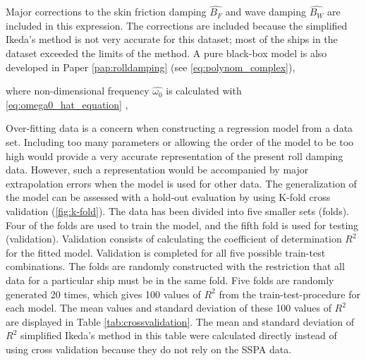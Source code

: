 \noindent Major corrections to the skin friction damping $\hat{B_F}$ and wave damping $\hat{B_W}$ are included in this expression. The corrections are included because the simplified Ikeda's method is not very accurate for this dataset; most of the ships in the dataset exceeded the limits of the method. A pure black-box model is also developed in Paper \ref{pap:rolldamping} (see \autoref{eq:polynom_complex}),

\noindent where non-dimensional frequency $\hat{\omega_0}$ is calculated with \autoref{eq:omega0_hat_equation} \cite{himenoPredictionShipRoll1981},

Over-fitting data is a concern when constructing a regression model from a data set. Including too many parameters or allowing the order of the model to be too high would provide a very accurate representation of the present roll damping data. However, such a representation would be accompanied by major extrapolation errors when the model is used for other data. The generalization of the model can be assessed with a hold-out evaluation by using K-fold cross validation \cite{mostellerHandbookSocialPsychology1968} (\autoref{fig:k-fold}). The data has been divided into five smaller sets (folds). Four of the folds are used to train the model, and the fifth fold is used for testing (validation). Validation consists of calculating the coefficient of determination $R^2$ for the fitted model. Validation is completed for all five possible train-test combinations. 
The folds are randomly constructed with the restriction that all data for a particular ship must be in the same fold. Five folds are randomly generated 20 times, which gives 100 values of $R^2$ from the train-test-procedure for each model. The mean values and standard deviation of these 100 values of $R^2$ are displayed in Table \ref{tab:crossvalidation}. The mean and standard deviation of $R^2$ simplified Ikeda's method in this table were calculated directly instead of using cross validation because they do not rely on the SSPA data.

\clearpage